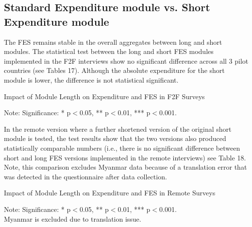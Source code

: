 \documentclass[11pt,harvard]{article}
\begin{document}
\subsection{Standard Expenditure module vs. Short Expenditure module}

The FES remains stable in the overall aggregates between long and short modules. The statistical test between the long and short FES modules implemented in the F2F interviews show no significant difference across all 3 pilot countries (see Tables 17). Although the absolute expenditure for the short module is lower, the difference is not statistical significant. 

\begin{table}[htbp]
	\centering
	\begin{adjustbox}{max width=\textwidth}
		\begin{threeparttable}
			\caption{Impact of Module Length on Expenditure and FES in F2F Surveys}
			\scriptsize
			 
			\label{tab:FES_F2F_Form_Length_All_Country}
			\begin{tablenotes}
				\item Note: Significance: * p$<$0.05, ** p$<$0.01, *** p$<$0.001. 
			\end{tablenotes}
		\end{threeparttable}
	\end{adjustbox}
\end{table}

In the remote version where a further shortened version of the original short module is tested, the test results show that the two versions also produced statistically comparable numbers (i.e., there is no significant difference between short and long FES versions implemented in the remote interviews) see Table 18. Note, this comparison excludes Myanmar data because of a translation error that was detected in the questionnaire after data collection.

\begin{table}[htbp]
	\centering
	\begin{adjustbox}{max width=\textwidth}
		\begin{threeparttable}
			\caption{Impact of Module Length on Expenditure and FES in Remote Surveys}
			\scriptsize
			 
			\label{tab:FES_RM_Form_Length_ECU_CAR}
			\begin{tablenotes}
				\item Note: Significance: * p$<$0.05, ** p$<$0.01, *** p$<$0.001. \\
						 Myanmar is excluded due to translation issue.
			\end{tablenotes}
		\end{threeparttable}
	\end{adjustbox}
\end{table}
\end{document}

